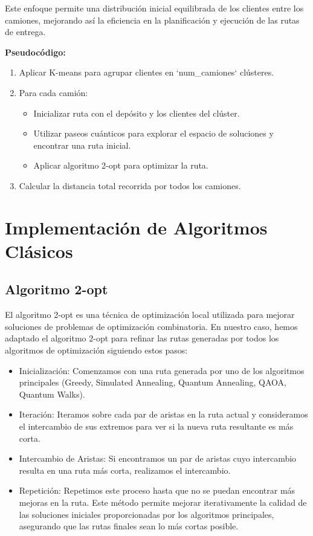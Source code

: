 \documentclass[11pt,a4paper,spanish]{book}
\begin{document}
Este enfoque permite una distribución inicial equilibrada de los clientes entre los camiones, mejorando así la eficiencia en la planificación y ejecución de las rutas de entrega.

\textbf{Pseudocódigo:}

\begin{tcolorbox}[colback=white!95!blue, colframe=blue!50!black, title=Kmeans, fontupper=\ttfamily]
\begin{enumerate}
    \item Aplicar K-means para agrupar clientes en `num\_camiones` clústeres.
    \item Para cada camión:
    \begin{itemize}
        \item Inicializar ruta con el depósito y los clientes del clúster.
        \item Utilizar paseos cuánticos para explorar el espacio de soluciones y encontrar una ruta inicial.
        \item Aplicar algoritmo 2-opt para optimizar la ruta.
    \end{itemize}
    \item Calcular la distancia total recorrida por todos los camiones.
\end{enumerate}
\end{tcolorbox}

\section{Implementación de Algoritmos Clásicos}

\subsection{Algoritmo 2-opt}

El algoritmo 2-opt es una técnica de optimización local utilizada para mejorar soluciones de problemas de optimización combinatoria. En nuestro caso, hemos adaptado el algoritmo 2-opt para refinar las rutas generadas por todos los algoritmos de optimización siguiendo estos pasos:
\begin{itemize}
	\item Inicialización: Comenzamos con una ruta generada por uno de los algoritmos principales (Greedy, Simulated Annealing, Quantum Annealing, QAOA, Quantum Walks).
    \item Iteración: Iteramos sobre cada par de aristas en la ruta actual y consideramos el intercambio de sus extremos para ver si la nueva ruta resultante es más corta.
    \item Intercambio de Aristas: Si encontramos un par de aristas cuyo intercambio resulta en una ruta más corta, realizamos el intercambio.
    \item Repetición: Repetimos este proceso hasta que no se puedan encontrar más mejoras en la ruta.
Este método permite mejorar iterativamente la calidad de las soluciones iniciales proporcionadas por los algoritmos principales, asegurando que las rutas finales sean lo más cortas posible.
\end{itemize}
\end{document}

